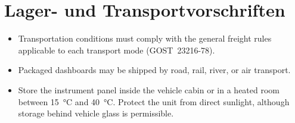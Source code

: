 \chapter{Lager- und Transportvorschriften}\label{ch:storage}

\begin{itemize}
    \item Transportation conditions must comply with the general freight rules applicable to each transport mode (GOST~23216-78).
    \item Packaged dashboards may be shipped by road, rail, river, or air transport.
    \item Store the instrument panel inside the vehicle cabin or in a heated room between \SI{15}{\celsius} and \SI{40}{\celsius}. Protect the unit from direct sunlight, although storage behind vehicle glass is permissible.
\end{itemize}
